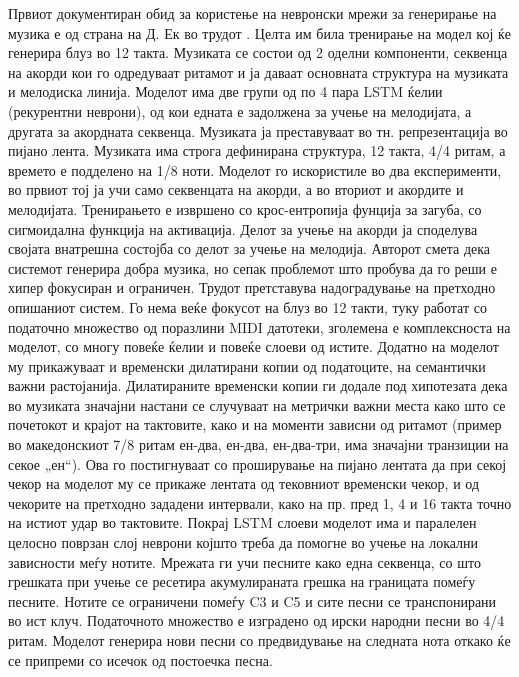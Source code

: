 Првиот документиран обид за користење на невронски мрежи за генерирање на музика е од страна на Д. Ек во трудот \cite{Eck2002}. Целта им била тренирање на модел кој ќе генерира блуз во 12 такта. Музиката се состои од 2 оделни компоненти, секвенца на акорди кои го одредуваат ритамот и ја даваат основната структура на музиката и мелодиска линија. Моделот има две групи од по 4 пара LSTM ќелии (рекурентни неврони), од кои едната е задолжена за учење на мелодијата, а другата за акордната секвенца. Музиката ја преставуваат во тн. репрезентација во пијано лента. Музиката има строга дефинирана структура, 12 такта, 4/4 ритам, а времето е подделено на 1/8 ноти. Моделот го искористиле во два експерименти, во првиот тој ја учи само секвенцата на акорди, а во вториот и акордите и мелодијата. Тренирањето е извршено со крос-ентропија фунција за загуба, со сигмоидална функција на активација. Делот за учење на акорди ја споделува својата внатрешна состојба со делот за учење на мелодија. Авторот смета дека системот генерира добра музика, но сепак проблемот што пробува да го реши е хипер фокусиран и ограничен. Трудот \cite{Eck2008} претставува надоградување на претходно опишаниот систем. Го нема веќе фокусот на блуз во 12 такти, туку работат со податочно множество од поразлини MIDI датотеки, зголемена е комплексноста на моделот, со многу повеќе ќелии и повеќе слоеви од истите. Додатно на моделот му прикажуваат и временски дилатирани копии од податоците, на семантички важни растојанија. Дилатираните временски копии ги додале под хипотезата дека во музиката значајни настани се случуваат на метрички важни места како што се почетокот и крајот на тактовите, како и на моменти зависни од ритамот (пример во македонскиот 7/8 ритам ен-два, ен-два, ен-два-три, има значајни транзиции на секое „ен“). Ова го постигнуваат со проширување на пијано лентата да при секој чекор на моделот му се прикаже лентата од тековниот временски чекор, и од чекорите на претходно зададени интервали, како на пр. пред 1, 4 и 16 такта точно на истиот удар во тактовите. Покрај LSTM слоеви моделот има и паралелен целосно поврзан слој неврони којшто треба да помогне во учење на локални зависности меѓу нотите. Мрежата ги учи песните како една секвенца, со што грешката при учење се ресетира акумулираната грешка на границата помеѓу песните. Нотите се ограничени помеѓу C3 и C5 и сите песни се транспонирани во ист клуч. Податочното множество е изградено од  ирски народни песни во 4/4 ритам. Моделот генерира нови песни со предвидување на следната нота откако ќе се припреми со исечок од постоечка песна.

